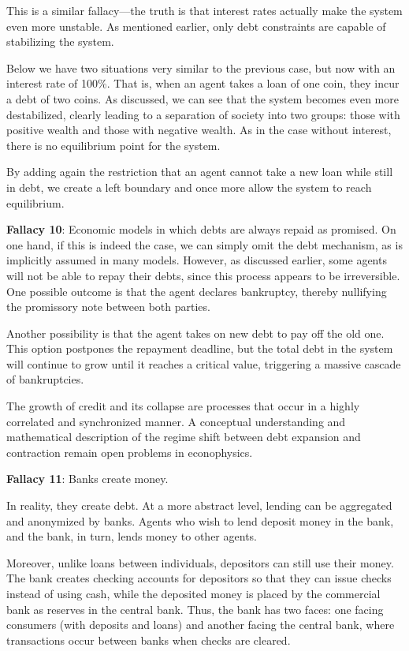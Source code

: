 This is a similar fallacy—the truth is that interest rates actually make the system even more unstable. As mentioned earlier, only debt constraints are capable of stabilizing the system.

Below we have two situations very similar to the previous case, but now with an interest rate of 100\%. That is, when an agent takes a loan of one coin, they incur a debt of two coins. As discussed, we can see that the system becomes even more destabilized, clearly leading to a separation of society into two groups: those with positive wealth and those with negative wealth. As in the case without interest, there is no equilibrium point for the system.

 By adding again the restriction that an agent cannot take a new loan while still in debt, we create a left boundary and once more allow the system to reach equilibrium. 

 \textbf{Fallacy 10}: Economic models in which debts are always repaid as promised. On one hand, if this is indeed the case, we can simply omit the debt mechanism, as is implicitly assumed in many models. However, as discussed earlier, some agents will not be able to repay their debts, since this process appears to be irreversible. One possible outcome is that the agent declares bankruptcy, thereby nullifying the promissory note between both parties.

Another possibility is that the agent takes on new debt to pay off the old one. This option postpones the repayment deadline, but the total debt in the system will continue to grow until it reaches a critical value, triggering a massive cascade of bankruptcies.

The growth of credit and its collapse are processes that occur in a highly correlated and synchronized manner. A conceptual understanding and mathematical description of the regime shift between debt expansion and contraction remain open problems in econophysics.

\textbf{Fallacy 11}: Banks create money.

In reality, they create debt. At a more abstract level, lending can be aggregated and anonymized by banks. Agents who wish to lend deposit money in the bank, and the bank, in turn, lends money to other agents.

Moreover, unlike loans between individuals, depositors can still use their money. The bank creates checking accounts for depositors so that they can issue checks instead of using cash, while the deposited money is placed by the commercial bank as reserves in the central bank. Thus, the bank has two faces: one facing consumers (with deposits and loans) and another facing the central bank, where transactions occur between banks when checks are cleared.

